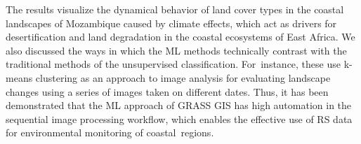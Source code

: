 \documentclass[coasts,article,accept,pdftex,oneauthor]{Definitions/mdpi}
\begin{document}
The{ }results {visualize} the {dynamical }behavior of land cover types in the coastal landscapes of Mozambique{ caused by} climate effects, {which act} as {drivers} for desertification and land degradation in{ }the coastal ecosystems {of East Africa}. {We} also discussed the ways in which the ML methods {technically }contrast with {the }traditional methods of {the }unsupervised classification{. For~instance, these use} k-means clustering {as an approach} to image analysis{ }for evaluating landscape changes using a series of images taken on different dates{. }Thus, {it has been demonstrated that }the ML approach of GRASS GIS{ has }high automation in the sequential image processing workflow, which enables {the }effective use of RS data for environmental monitoring of coastal~regions.






\end{document}
